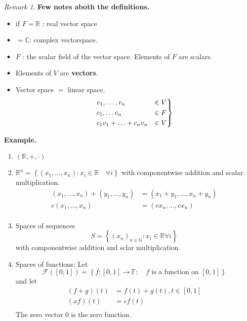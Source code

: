 \documentclass{article}
\theoremstyle{remark}
\newtheorem*{remark}{Remark}
\begin{document}
 \begin{remark}
   \textbf{Few notes aboth the definitions.} 
   \begin{itemize}
     \item if $F = \mathbb{R} $ : real vector space
     \item $ =  \mathbb{C} $: complex vectorspace.
     \item $F$ : the scalar field of the vector space. Elements of $F$ are scalars.
     \item Elements of $V$ are \textbf{vectors}.
     \item Vector space $=$ linear space. \[
     \begin{rcases}
       v_1, \ldots , v_{n}   &  \in     V \\
       c_1, \ldots  c_{n}  &  \in     F \\
       c_{1} v_{1} + \ldots + c_{n} v_{n}  &  \in    V
     \end{rcases}
     \] 
   \end{itemize}
 \end{remark}
 
 \begin{tcolorbox}
   \textbf{Example.}  
   \begin{enumerate}
     \item  $\left( \mathbb{R} , + , \cdot  \right)$
     \item $\mathbb{R} ^{n} = \left\{ \left( x_{1},  \ldots, x_{n} \right) : x_i \in  \mathbb{R}  \quad \forall i  \right\}$ with componentwise addition and scalar multiplication. \[
         \begin{split}
     \left( x_{1}, \ldots, x_{n} \right) + \left(  y_{1} , \ldots , y_{n}\right) &= \left( x_{1} + y_{1}, \ldots , x_{n} + y_{n} \right) \\
     c\left( x_{1}, \ldots, x_{n}\right) &=  \left( cx_{n} , \ldots, cx_{n}  \right) \\
         \end{split} 
     \] 
   \item Spaces of sequences \[
   S = \left\{ \left( x_{n} \right)_{n \in \mathbb{N} } : x_{i} \in  \mathbb{R}  \forall i \right\}
   \] 
   with componentwise addition and sclar multiplication. 
 \item Spaces of functions: Let 
   \[
   \mathcal{F} \left( \left[ 0,1 \right] \right) = \left\{ f: \left[ 0,1 \right] \to  \mathbb{F} : \quad f \text{ is a function on } \left[ 0,1 \right]  \right\}
   \] 
   and let \[
     \begin{split}
   \left( f+g \right)\left( t \right) &=  f\left( t \right) + g\left( t \right) , t \in  \left[ 0,1 \right] \\
   \left( xf \right)\left( t \right) &=  c f\left( t \right) \\
     \end{split} 
   \] 
   The zero vector $0$ is the zero function.
   
   \end{enumerate}
 \end{tcolorbox}
\end{document}
